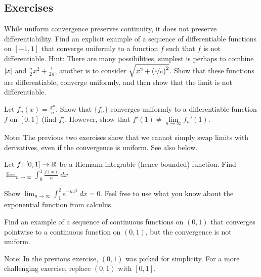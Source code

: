 \subsection{Exercises}

\begin{exercise}
While uniform convergence preserves continuity, it does not preserve
differentiability.  Find an explicit example of a sequence of
differentiable functions on $[-1,1]$ that converge uniformly to
a function $f$ such that $f$ is not differentiable.
Hint:
There are many possibilities,
simplest is perhaps to combine $\left\lvert {x} \right\rvert$ and $\frac{n}{2}x^2 +
\frac{1}{2n}$, another is to
consider $\sqrt{x^2+{(\nicefrac{1}{n})}^2}$.  Show that these functions are differentiable,
converge uniformly, and then show that the limit is not differentiable.
\end{exercise}

\begin{exercise}
Let $f_n(x) = \frac{x^n}{n}$.  Show that $\{ f_n \}$ converges uniformly to
a differentiable function $f$ on $[0,1]$ (find $f$).  However, show that
$f'(1) \not= \lim\limits_{n\to\infty} f_n'(1)$.
\end{exercise}

\begin{exnote}
Note: The previous two exercises show that
we cannot simply swap limits with derivatives, even if the convergence is
uniform.  See also  below.
\end{exnote}

\begin{exercise}
Let $f \colon [0,1] \to {\mathbb{R}}$ be a Riemann integrable (hence bounded)
function.  Find
$\displaystyle \lim_{n\to\infty} \int_0^1 \frac{f(x)}{n} ~dx$.
\end{exercise}

\begin{exercise}
Show
$\displaystyle \lim_{n\to\infty} \int_1^2 e^{-nx^2} ~dx = 0$.  Feel free to
use
what you know about the exponential function from calculus.
\end{exercise}

\begin{exercise}
Find an example of a sequence of continuous functions on $(0,1)$ that converges 
pointwise to a continuous function on $(0,1)$, but the convergence is not
uniform.
\end{exercise}

\begin{exnote}
Note: In the previous exercise, $(0,1)$ was picked for simplicity.  For a
more challenging exercise, replace $(0,1)$ with $[0,1]$.
\end{exnote}

